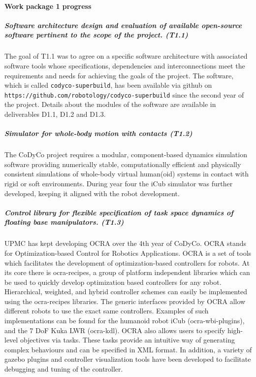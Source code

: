 

\paragraph{Work package 1 progress}

\subparagraph*{Software architecture design and evaluation of available
  open-source software pertinent to the scope of the project. (T1.1)}

The goal of T1.1 was to agree on a specific software architecture with
associated software tools whose specifications, dependencies and
interconnections meet the requirements and needs for achieving the goals of
the project.  The software, which is called \texttt{codyco-superbuild}, has
been available via github on
\texttt{https://github.com/robotology/codyco-superbuild} since the second year
of the project.  Details about the modules of the software are available in
deliverables D1.1, D1.2 and D1.3.

\subparagraph*{Simulator for whole-body motion with contacts (T1.2)}

The CoDyCo project requires a modular, component-based dynamics simulation
software providing numerically stable, computationally efficient and
physically consistent simulations of whole-body virtual human(oid) systems in
contact with rigid or soft environments.  During year four the iCub simulator
was further developed, keeping it aligned with the robot development.


\subparagraph*{Control library for flexible specification of task space
  dynamics of floating base manipulators. (T1.3)}
\label{sec:OCRA} 

UPMC has kept developing OCRA over the 4th year of CoDyCo.  OCRA stands for
Optimization-based Control for Robotics Applications.  OCRA is a set of tools
which facilitates the development of optimization-based controllers for
robots.  At its core there is ocra-recipes, a group of platform independent
libraries which can be used to quickly develop optimization based controllers
for any robot.  Hierarchical, weighted, and hybrid controller schemes can
easily be implemented using the ocra-recipes libraries.  The generic
interfaces provided by OCRA allow different robots to use the exact same
controllers.  Examples of such implementations can be found for the humanoid
robot iCub (ocra-wbi-plugins), and the 7 DoF Kuka LWR (ocra-kdl).  OCRA also
allows users to specify high-level objectives via tasks.  These tasks provide
an intuitive way of generating complex behaviours and can be specified in XML
format.  In addition, a variety of gazebo plugins and controller visualization
tools have been developed to facilitate debugging and tuning of the
controller.

